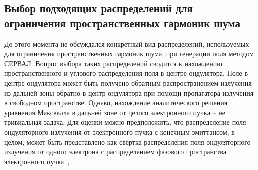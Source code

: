 \subsection{Выбор подходящих распределений для ограничения пространственных гармоник шума}
До этого момента не обсуждался конкретный вид распределений, используемых для ограничения пространственных гармоник шума, при генерации поля методом СЕРВАЛ. Вопрос выбора таких распределений сводится к нахождению пространственного и углового распределения поля в центре ондулятора. Поле в центре ондулятора может быть получено обратным распространением излучения из дальней зоны обратно в центр ондулятора при помощи пропагатора излучения в свободном пространстве. Однако, нахождение аналитического решения уравнения Максвелла в дальней зоне от целого электронного пучка -- не тривиальная задача. Для оценки можно предположить, что распределение поля ондуляторного излучения от электронного пучка с конечным эмиттансом, в целом, может быть представлено как свёртка распределения поля ондуляторного излучения от одного электрона с распределением фазового пространства электронного пучка~\cite{geloni_transverse_2008},~\cite{chubar_simulation_2006}.

